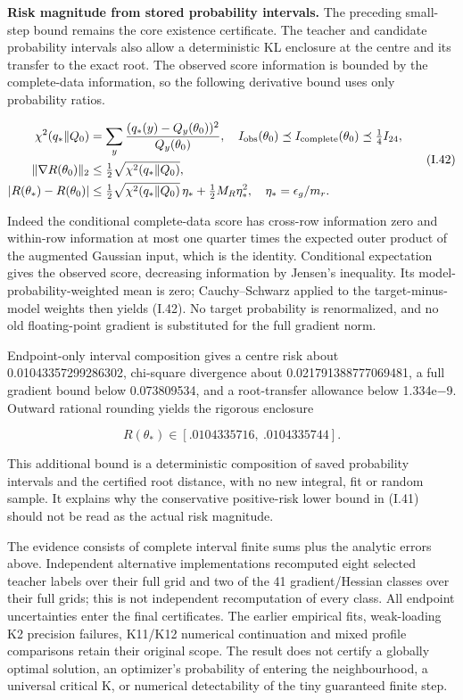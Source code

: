 \documentclass{article}
\begin{document}
\textbf{Risk magnitude from stored probability intervals.} The preceding
small-step bound remains the core existence certificate. The teacher and
candidate probability intervals also allow a deterministic KL enclosure
at the centre and its transfer to the exact root. The observed score
information is bounded by the complete-data information, so the
following derivative bound uses only probability ratios.

\[
\begin{aligned}
\chi^2(q_*\Vert Q_0)&=\sum_y\frac{(q_*(y)-Q_y(\theta_0))^2}{Q_y(\theta_0)},\quad
I_{\rm obs}(\theta_0)\preceq I_{\rm complete}(\theta_0)\preceq\tfrac14I_{24},\\
\|\nabla R(\theta_0)\|_2&\le\tfrac12\sqrt{\chi^2(q_*\Vert Q_0)},\\
|R(\theta_*)-R(\theta_0)|&\le\tfrac12\sqrt{\chi^2(q_*\Vert Q_0)}\,\eta_*+\tfrac12M_R\eta_*^2,\quad
\eta_*=\epsilon_g/m_r.
\end{aligned}
\tag{I.42}
\]

Indeed the conditional complete-data score has cross-row information
zero and within-row information at most one quarter times the expected
outer product of the augmented Gaussian input, which is the identity.
Conditional expectation gives the observed score, decreasing information
by Jensen's inequality. Its model-probability-weighted mean is zero;
Cauchy--Schwarz applied to the target-minus-model weights then yields
(I.42). No target probability is renormalized, and no old floating-point
gradient is substituted for the full gradient norm.

Endpoint-only interval composition gives a centre risk about
0.01043357299286302, chi-square divergence about 0.021791388777069481, a
full gradient bound below 0.073809534, and a root-transfer allowance
below 1.334e−9. Outward rational rounding yields the rigorous enclosure

\[
R(\theta_*)\in[.0104335716,\ .0104335744].
\tag{I.43}
\]

This additional bound is a deterministic composition of saved
probability intervals and the certified root distance, with no new
integral, fit or random sample. It explains why the conservative
positive-risk lower bound in (I.41) should not be read as the actual
risk magnitude.

The evidence consists of complete interval finite sums plus the analytic
errors above. Independent alternative implementations recomputed eight
selected teacher labels over their full grid and two of the 41
gradient/Hessian classes over their full grids; this is not independent
recomputation of every class. All endpoint uncertainties enter the final
certificates. The earlier empirical fits, weak-loading K2 precision
failures, K11/K12 numerical continuation and mixed profile comparisons
retain their original scope. The result does not certify a globally
optimal solution, an optimizer's probability of entering the
neighbourhood, a universal critical K, or numerical detectability of the
tiny guaranteed finite step.
\end{document}
